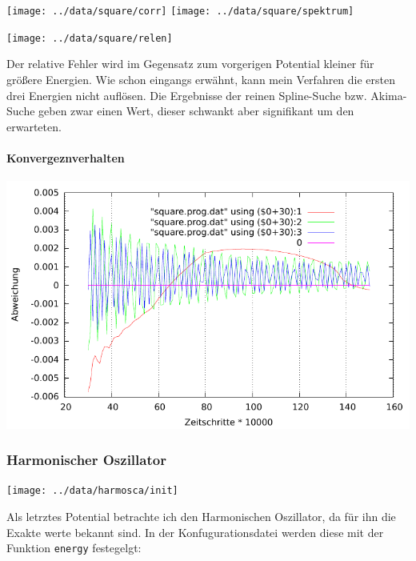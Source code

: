 \documentclass[10pt,a4paper,german]{scrartcl}
\begin{document}
		  	\texttt{[image: ../data/square/corr]}
    		\texttt{[image: ../data/square/spektrum]}
    		
			  \begin{center}\end{center}
			  
	  		\texttt{[image: ../data/square/relen]}
	  		
	  		Der relative Fehler wird im Gegensatz zum vorgerigen Potential
	  		kleiner für größere Energien. Wie schon eingangs erwähnt, kann
	  		mein Verfahren die ersten drei Energien nicht auflösen. Die 
	  		Ergebnisse der reinen Spline-Suche bzw. Akima-Suche geben zwar einen
	  		Wert, dieser schwankt aber signifikant um den erwarteten.
	  		
  			\paragraph*{Konvergeznverhalten}
  			  \includegraphics[scale=.62]{../static/square_konv.pdf}
	  		
      \subsubsection*{Harmonischer Oszillator}
  			\texttt{[image: ../data/harmosca/init]}

        Als letrztes Potential betrachte ich den Harmonischen Oszillator, 
        da für ihn die Exakte werte bekannt sind.  In der Konfugurationsdatei
        werden diese mit der Funktion \verb!energy! festegelgt:
  			
\end{document}
